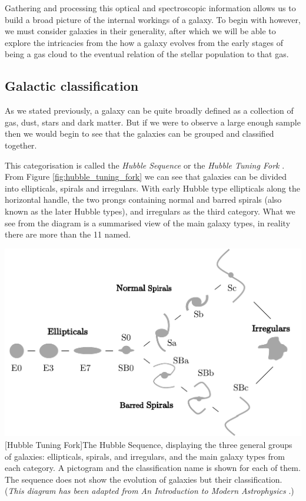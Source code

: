 \documentclass[12pt, twocolumn]{revtex4}    %
\begin{document}
Gathering and processing this optical and spectroscopic information allows us to build a broad picture of the internal workings of a galaxy. To begin with however, we must consider galaxies in their generality, after which we will be able to explore the intricacies from the how a galaxy evolves from the early stages of being a gas cloud to the eventual relation of the stellar population to that gas.

\subsection{Galactic classification}

As we stated previously, a galaxy can be quite broadly defined as a collection of gas, dust, stars and dark matter. But if we were to observe a large enough sample then we would begin to see that the galaxies can be grouped and classified together.

This categorisation is called the \textit{Hubble Sequence} or the \textit{Hubble Tuning Fork} \cite{carroll_astro}. From Figure \ref{fig:hubble_tuning_fork} we can see that galaxies can be divided into ellipticals, spirals and irregulars. With early Hubble type ellipticals along the horizontal handle, the two prongs containing normal and barred spirals (also known as the later Hubble types), and irregulars as the third category. What we see from the diagram is a summarised view of the main galaxy types, in reality there are more than the 11 named. 


\begin{center}
\includegraphics[width=1.0\linewidth]{introduction/hubble_tuning_fork}
[Hubble Tuning Fork]{The Hubble Sequence, displaying the three general groups of galaxies: ellipticals, spirals, and irregulars, and the main galaxy types from each category. A pictogram and the classification name is shown for each of them. The sequence does not show the evolution of galaxies but their classification. \\ (\textit{This diagram has been adapted from An Introduction to Modern Astrophysics} \cite{carroll_astro}.)}
\label{fig:hubble_tuning_fork}
\end{center}
\end{document}
